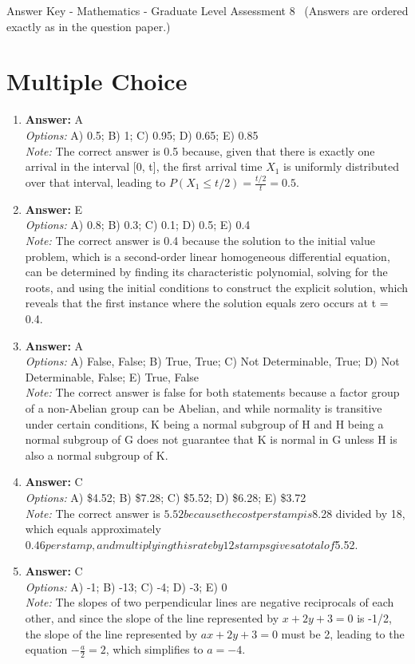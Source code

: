 \documentclass[12pt]{article}
\begin{document}
\begin{center}
Answer Key - Mathematics - Graduate Level Assessment 8 \
\small (Answers are ordered exactly as in the question paper.)
\end{center}

\section*{Multiple Choice}
\begin{enumerate}[label=\arabic*.]
\item \textbf{Answer:} A
\\ \textit{Options:} A) 0.5; B) 1; C) 0.95; D) 0.65; E) 0.85
\\ \textit{Note:} The correct answer is 0.5 because, given that there is exactly one arrival in the interval [0, t], the first arrival time \(X_1\) is uniformly distributed over that interval, leading to \(P(X_1 \leq t/2) = \frac{t/2}{t} = 0.5\).
\item \textbf{Answer:} E
\\ \textit{Options:} A) 0.8; B) 0.3; C) 0.1; D) 0.5; E) 0.4
\\ \textit{Note:} The correct answer is 0.4 because the solution to the initial value problem, which is a second-order linear homogeneous differential equation, can be determined by finding its characteristic polynomial, solving for the roots, and using the initial conditions to construct the explicit solution, which reveals that the first instance where the solution equals zero occurs at t = 0.4.
\item \textbf{Answer:} A
\\ \textit{Options:} A) False, False; B) True, True; C) Not Determinable, True; D) Not Determinable, False; E) True, False
\\ \textit{Note:} The correct answer is false for both statements because a factor group of a non-Abelian group can be Abelian, and while normality is transitive under certain conditions, K being a normal subgroup of H and H being a normal subgroup of G does not guarantee that K is normal in G unless H is also a normal subgroup of K.
\item \textbf{Answer:} C
\\ \textit{Options:} A) \$4.52; B) \$7.28; C) \$5.52; D) \$6.28; E) \$3.72
\\ \textit{Note:} The correct answer is $5.52 because the cost per stamp is $8.28 divided by 18, which equals approximately $0.46 per stamp, and multiplying this rate by 12 stamps gives a total of $5.52.
\item \textbf{Answer:} C
\\ \textit{Options:} A) -1; B) -13; C) -4; D) -3; E) 0
\\ \textit{Note:} The slopes of two perpendicular lines are negative reciprocals of each other, and since the slope of the line represented by $x + 2 y + 3 = 0$ is -1/2, the slope of the line represented by $ax + 2 y + 3 = 0$ must be 2, leading to the equation $-\frac{a}{2} = 2$, which simplifies to $a = -4$.
\end{enumerate}
\end{document}

